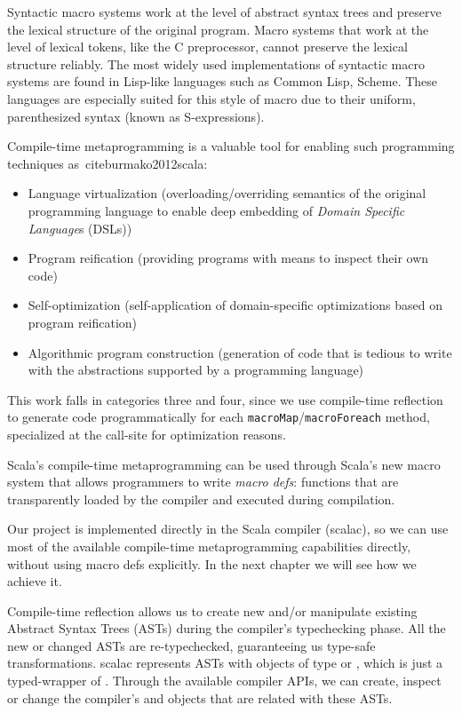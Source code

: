 Syntactic macro systems work at the level of abstract syntax trees and preserve
the lexical structure of the original program. Macro systems that work at the
level of lexical tokens, like the C preprocessor, cannot preserve the
lexical structure reliably. The most widely used implementations of syntactic
macro systems are found in Lisp-like languages such as Common Lisp, Scheme. 
These languages are especially suited for this style of macro due to their uniform,
parenthesized syntax (known as S-expressions).

Compile-time metaprogramming is a valuable tool for enabling such programming
techniques as~cite{burmako2012scala}:

\begin{itemize}
  \item
    Language virtualization (overloading/overriding semantics of the original
    programming language to enable deep embedding of \emph{Domain Specific Language}s (DSLs))
  \item
    Program reification (providing programs with means to inspect their own code)
  \item
     Self-optimization (self-application of domain-specific optimizations based on
program reification)
  \item
    Algorithmic program construction (generation of code that is tedious to write
    with the abstractions supported by a programming language)
\end{itemize}

This work falls in categories three and four, since we use compile-time
reflection to generate code programmatically for each \texttt{macroMap}/\texttt{macroForeach}
method, specialized at the call-site for optimization reasons.

Scala's compile-time metaprogramming can be used through Scala's new macro
system that allows programmers to write \emph{macro defs}: functions that are
transparently loaded by the compiler and executed during compilation.

Our project is implemented directly in the Scala compiler (scalac), so we can
use most of the available compile-time metaprogramming capabilities directly,
without using macro defs explicitly. In the next chapter we will see how we
achieve it.

Compile-time reflection allows us to create new and/or manipulate
existing Abstract Syntax Trees (ASTs) during the compiler's typechecking phase.
All the new or changed ASTs are re-typechecked, guaranteeing us type-safe
transformations. scalac represents ASTs with objects of type
 or , which is just a typed-wrapper
of . Through the available compiler APIs, we can create,
inspect or change the compiler's  and
 objects that are related with these ASTs.

